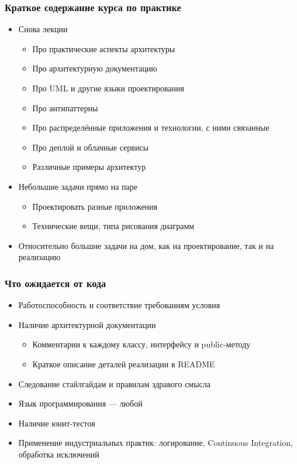 \documentclass[xetex,mathserif,serif]{beamer}
\begin{document}
    \begin{frame}
        \frametitle{Краткое содержание курса по практике}
        \begin{itemize}
            \item Снова лекции
            \begin{itemize}
                \item Про практические аспекты архитектуры
                \item Про архитектурную документацию
                \item Про UML и другие языки проектирования
                \item Про антипаттерны
                \item Про распределённые приложения и технологии, с ними связанные
                \item Про деплой и облачные сервисы
                \item Различные примеры архитектур
            \end{itemize}
            \item Небольшие задачи прямо на паре
            \begin{itemize}
                \item Проектировать разные приложения
                \item Технические вещи, типа рисования диаграмм
            \end{itemize}
            \item Относительно большие задачи на дом, как на проектирование, так и на реализацию
        \end{itemize}
    \end{frame}
    
    \begin{frame}
        \frametitle{Что ожидается от кода}
        \begin{itemize}
            \item Работоспособность и соответствие требованиям условия
            \item Наличие архитектурной документации
            \begin{itemize}
                \item Комментарии к каждому классу, интерфейсу и public-методу
                \item Краткое описание деталей реализации в README
            \end{itemize}
            \item Следование стайлгайдам и правилам здравого смысла 
            \item Язык программирования --- любой
            \item Наличие юнит-тестов
            \item Применение индустриальных практик: логирование, Continuous Integration, обработка исключений
        \end{itemize}
    \end{frame}
\end{document}
